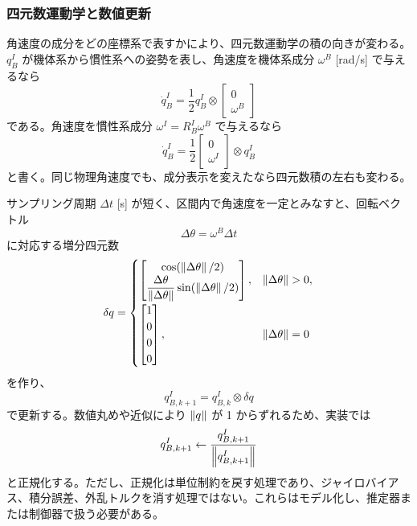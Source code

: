 \subsubsection{四元数運動学と数値更新}

角速度の成分をどの座標系で表すかにより、四元数運動学の積の向きが変わる。$q^I_B$ が機体系から慣性系への姿勢を表し、角速度を機体系成分 $\omega^B$ [rad/s] で与えるなら
\begin{equation}
  \dot{q}^I_B
  =
  \frac{1}{2}q^I_B\otimes
  \begin{bmatrix}
    0\\ \omega^B
  \end{bmatrix}
\end{equation}
である。角速度を慣性系成分 $\omega^I=R^I_B\omega^B$ で与えるなら
\begin{equation}
  \dot{q}^I_B
  =
  \frac{1}{2}
  \begin{bmatrix}
    0\\ \omega^I
  \end{bmatrix}
  \otimes q^I_B
\end{equation}
と書く。同じ物理角速度でも、成分表示を変えたなら四元数積の左右も変わる。

サンプリング周期 $\Delta t$ [s] が短く、区間内で角速度を一定とみなすと、回転ベクトル
\begin{equation}
  \Delta\theta=\omega^B\Delta t
\end{equation}
に対応する増分四元数
\begin{equation}
  \delta q=
  \begin{cases}
    \begin{bmatrix}
      \cos(\norm{\Delta\theta}/2)\\
      \dfrac{\Delta\theta}{\norm{\Delta\theta}}
      \sin(\norm{\Delta\theta}/2)
    \end{bmatrix},
    & \norm{\Delta\theta}>0,\\[3ex]
    \begin{bmatrix}
      1\\0\\0\\0
    \end{bmatrix},
    & \norm{\Delta\theta}=0
  \end{cases}
\end{equation}
を作り、
\begin{equation}
  q^I_{B,k+1}=q^I_{B,k}\otimes\delta q
\end{equation}
で更新する。数値丸めや近似により $\left\|q\right\|$ が 1 からずれるため、実装では
\begin{equation}
  q^I_{B,k+1}\leftarrow
  \frac{q^I_{B,k+1}}{\left\|q^I_{B,k+1}\right\|}
\end{equation}
と正規化する。ただし、正規化は単位制約を戻す処理であり、ジャイロバイアス、積分誤差、外乱トルクを消す処理ではない。これらはモデル化し、推定器または制御器で扱う必要がある。

